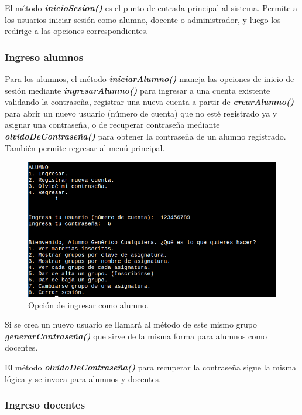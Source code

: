 \documentclass[a4paper,12pt]{article}
\begin{document}
El método \textbf{\textit{inicioSesion()}} es el punto de entrada principal al sistema. Permite a los usuarios iniciar sesión como alumno, docente o administrador, y luego los redirige a las opciones correspondientes.

\subsubsection{Ingreso alumnos}

Para los alumnos, el método \textbf{\textit{iniciarAlumno()}} maneja las opciones de inicio de sesión mediante \textbf{\textit{ingresarAlumno()}} para ingresar a una cuenta existente validando la contraseña, registrar una nueva cuenta a partir de \textbf{\textit{crearAlumno()}} para abrir un nuevo usuario (número de cuenta) que no esté registrado ya y asignar una contraseña, o de recuperar contraseña mediante \textbf{\textit{olvidoDeContraseña()}} para obtener la contraseña de un alumno registrado. También permite regresar al menú principal.

\begin{figure}[ht]
    \centering
    \includegraphics[width=.9\textwidth]{media/ingreso_alumno.png}
    \caption{Opción de ingresar como alumno.}
    \label{fig:ingresoalu}
\end{figure}

Si se crea un nuevo usuario se llamará al método de este mismo grupo \textbf{\textit{generarContraseña()}} que sirve de la misma forma para alumnos como docentes.

El método \textbf{\textit{olvidoDeContraseña()}} para recuperar la contraseña sigue la misma lógica y se invoca para alumnos y docentes.

\subsubsection{Ingreso docentes}
\end{document}
